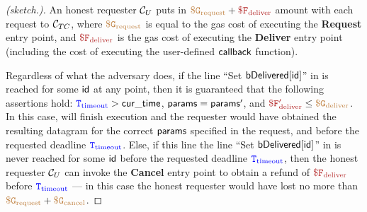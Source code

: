 \begin{proof}[(sketch.)]
An honest requester ${\cal C}_U$  
puts in 
$\sbrown{\$ G_{\text{request}}} + \smaroon{\$ F_{\text{deliver}}}$
amount with each request to ${\cal C}_{TC}$,
where $\tt {\color{brown} \$ G_{\text{request}} }$
is equal to the gas cost of executing the
{\bf Request} entry point,
and $\smaroon{\$ F_{\text{deliver}}}$ is the gas cost
of executing the {\bf Deliver} entry point (including
the cost of executing the user-defined ${\sf callback}$ function).

Regardless of what the adversary does,  
if the line ``Set ${\sf bDelivered[{\sf id}]}$''
in \tcont
is reached for some ${\sf id}$ at any point,
then it is guaranteed that the following assertions
hold:
${\color{blue} {{\tt T}}_{\text{timeout}}} > {\sf cur\_time}$,
${\sf params} = {\sf params}'$,
and $\smaroon{\$ F'_{\text{deliver}}} \leq 
\sbrown{\$ G_{\text{deliver}}}$.
In this case, \tcont will finish execution and the requester
would have obtained the resulting 
datagram for the correct ${\sf params}$ specified in the request,
and before the requested deadline ${\color{blue} {{\tt T}}_{\text{timeout}}}$.
Else, if this line 
the line ``Set ${\sf bDelivered[{\sf id}]}$''
in \tcont
is never reached for some ${\sf id}$ before the requested deadline 
${\color{blue} {{\tt T}}_{\text{timeout}}}$, then 
the honest requester ${\cal C}_U$ can invoke the {\bf Cancel}
entry point to obtain a refund 
of $\smaroon{\$F_{\text{deliver}}}$ before ${\color{blue} {{\tt T}}_{\text{timeout}}}$ ---
in this case the honest requester would have lost
no more than $\tt {\color{brown} \$ G_{\text{request}} } + \tt {\color{brown} \$ G_{\text{cancel}} }$.
\end{proof}



